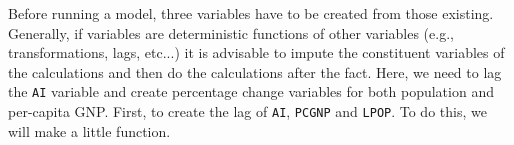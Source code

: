 \documentclass[12pt]{article}\usepackage[]{graphicx}\usepackage[]{color}
\makeatletter
\newcommand{\hlnum}[1]{\textcolor[rgb]{0.686,0.059,0.569}{#1}}%
\newcommand{\hlstr}[1]{\textcolor[rgb]{0.192,0.494,0.8}{#1}}%
\newcommand{\hlopt}[1]{\textcolor[rgb]{0,0,0}{#1}}%
\newcommand{\hlstd}[1]{\textcolor[rgb]{0.345,0.345,0.345}{#1}}%
\newcommand{\hlkwb}[1]{\textcolor[rgb]{0.69,0.353,0.396}{#1}}%
\newcommand{\hlkwc}[1]{\textcolor[rgb]{0.333,0.667,0.333}{#1}}%
\newcommand{\hlkwd}[1]{\textcolor[rgb]{0.737,0.353,0.396}{\textbf{#1}}}%
\newenvironment{kframe}{%
 \def\at@end@of@kframe{}%
 \ifinner\ifhmode%
  \def\at@end@of@kframe{\end{minipage}}%
  \begin{minipage}{\columnwidth}%
 \fi\fi%
 \def\FrameCommand##1{\hskip\@totalleftmargin \hskip-\fboxsep
 \colorbox{shadecolor}{##1}\hskip-\fboxsep
     \hskip-\linewidth \hskip-\@totalleftmargin \hskip\columnwidth}%
 \MakeFramed {\advance\hsize-\width
   \@totalleftmargin\z@ \linewidth\hsize
   \@setminipage}}%
 {\par\unskip\endMakeFramed%
 \at@end@of@kframe}
\newenvironment{knitrout}{}{} %
\makeatother
\begin{document}
Before running a model, three variables have to be created from those existing.  Generally, if variables are deterministic functions of other variables (e.g., transformations, lags, etc...) it is advisable to impute the constituent variables of the calculations and then do the calculations after the fact.  Here, we need to lag the \verb"AI" variable and create percentage change variables for both population and per-capita GNP.  First, to create the lag of \verb"AI", \verb"PCGNP" and \verb"LPOP".  To do this, we will make a little function.  
\end{document}

